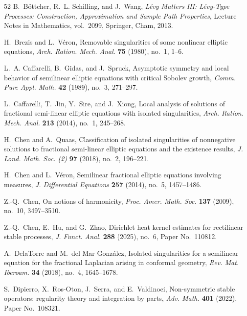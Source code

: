 \documentclass[11pt,a4paper,reqno]{amsart}
\theoremstyle{definition}
\numberwithin{equation}{section}
\begin{document}
\begin{thebibliography}{52}
B.~B\"ottcher, R.~L. Schilling, and J.~Wang,
\emph{L\'evy Matters III: L\'evy-Type Processes: Construction, Approximation and Sample Path Properties},
Lecture Notes in Mathematics, vol.~2099,
Springer, Cham, 2013.

H.~Brezis and L.~V\'eron,
Removable singularities of some nonlinear elliptic equations,
\emph{Arch. Ration. Mech. Anal.} \textbf{75} (1980), no.~1, 1--6.

L.~A. Caffarelli, B.~Gidas, and J.~Spruck,
Asymptotic symmetry and local behavior of semilinear elliptic equations with critical Sobolev growth,
\emph{Comm. Pure Appl. Math.} \textbf{42} (1989), no.~3, 271--297.

L.~Caffarelli, T.~Jin, Y.~Sire, and J.~Xiong,
Local analysis of solutions of fractional semi-linear elliptic equations with isolated singularities,
\emph{Arch. Ration. Mech. Anal.} \textbf{213} (2014), no.~1, 245--268.





H.~Chen and A.~Quaas,
Classification of isolated singularities of nonnegative solutions to fractional semi-linear elliptic equations and the existence results,
\emph{J. Lond. Math. Soc. (2)} \textbf{97} (2018), no.~2, 196--221.

H.~Chen and L.~V\'eron,
Semilinear fractional elliptic equations involving measures,
\emph{J. Differential Equations} \textbf{257} (2014), no.~5, 1457--1486.

Z.-Q.~Chen,
On notions of harmonicity,
\emph{Proc. Amer. Math. Soc.} \textbf{137} (2009), no.~10, 3497--3510.

Z.-Q.~Chen, E.~Hu, and G.~Zhao,
Dirichlet heat kernel estimates for rectilinear stable processes,
\emph{J. Funct. Anal.} \textbf{288} (2025), no.~6, Paper No.~110812.



A.~DelaTorre and M.~del Mar Gonz\'alez,
Isolated singularities for a semilinear equation for the fractional Laplacian arising in conformal geometry,
\emph{Rev. Mat. Iberoam.} \textbf{34} (2018), no.~4, 1645--1678.

S.~Dipierro, X.~Ros-Oton, J.~Serra, and E.~Valdinoci,
Non-symmetric stable operators: regularity theory and integration by parts,
\emph{Adv. Math.} \textbf{401} (2022), Paper No.~108321.






\end{thebibliography}
\end{document}
